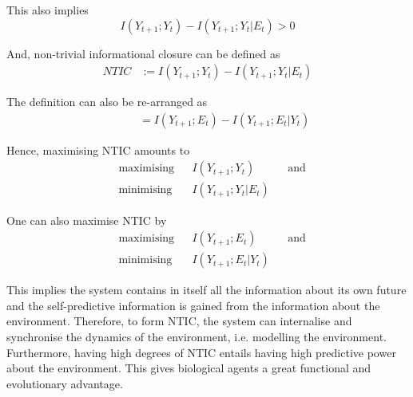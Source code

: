 \documentclass[utf8]{article}
\begin{document}
			\noindent
			This also implies
				\begin{equation}
					I(Y_{t+1};Y_{t})-I(Y_{t+1};Y_{t}|E_{t}) > 0
				\end{equation}



			\noindent
			And, non-trivial informational closure can be defined as
				\begin{equation}
				\label{eq:NTIC}
    				\left.\begin{array}
    				{rl}{NTIC} & {:=I(Y_{t+1};Y_{t})-I(Y_{t+1};Y_{t}|E_{t})}
    				\end{array} \right.
				\end{equation}
				
				
			\noindent
            The definition can also be re-arranged as 
				\begin{equation}
				\label{eq:NTIC2}
    				\left.\begin{array}
    				{rl}{\qquad} & {\ =I(Y_{t+1};E_{t})-I(Y_{t+1};E_{t}|Y_{t})}
    				\end{array} \right.
				\end{equation}				

			\noindent
			Hence, maximising NTIC amounts to
				\begin{equation}
    				\label{eq:nticObjective}
    				\begin{aligned}
    				& \text{maximising} & { } & I(Y_{t+1};Y_{t}) & { } & \text{and} \\
    				& \text{minimising} & { } & I(Y_{t+1};Y_{t}|E_{t}) & { }
    				\end{aligned}
				\end{equation}
				
			One can also maximise NTIC by 
				\begin{equation}
    				\label{eq:nticObjective2}
    				\begin{aligned}
    				& \text{maximising} & { } & I(Y_{t+1};E_{t}) & { } & \text{and} \\
    				& \text{minimising} & { } & I(Y_{t+1};E_{t}|Y_{t}) & { }
    				\end{aligned}
				\end{equation}			

			\noindent
			This implies the system contains in itself all the information about its own future and the self-predictive information is gained from the information about the environment. Therefore, to form NTIC, the system can internalise and synchronise the dynamics of the environment, i.e. modelling the environment. Furthermore, having high degrees of NTIC entails having high predictive power about the environment. This gives biological agents a great functional and evolutionary advantage. 
			
\end{document}
